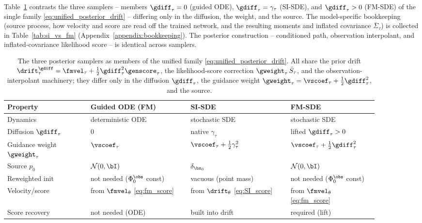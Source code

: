 Table~\ref{tab:samplers} contrasts the three samplers -- members $\gdiff_\tau=0$ (guided ODE), $\gdiff_\tau=\gamma_\tau$ (SI-SDE), and $\gdiff_\tau>0$ (FM-SDE) of the single family \eqref{eq:unified_posterior_drift} -- differing only in the diffusion, the weight, and the source. The model-specific bookkeeping (source process, how velocity and score are read off the trained network, and the resulting moments and inflated covariance $\bar\Sigma_\tau$) is collected in Table~\ref{tab:si_vs_fm} (Appendix~\ref{appendix:bookkeeping}). The posterior construction -- conditioned path, observation interpolant, and inflated-covariance likelihood score -- is identical across samplers.

\begin{table}[ht]
    \centering
    \caption{The three posterior samplers as members of the unified family \eqref{eq:unified_posterior_drift}. All share the prior drift $\drift^{\gdiff}_\tau=\fmvel_\tau+\tfrac12\gdiff_\tau^2\genscore_\tau$, the likelihood-score correction $\gweight_\tau\,\bar S_\tau$, and the observation-interpolant machinery; they differ only in the diffusion $\gdiff_\tau$, the guidance weight $\gweight_\tau=\vscoef_\tau+\tfrac12\gdiff_\tau^2$, and the source.}
    \label{tab:samplers}
    \small
    \begin{tabular}{p{0.2\linewidth}|p{0.24\linewidth}|p{0.24\linewidth}|p{0.21\linewidth}}
        \toprule
        \textbf{Property} & \textbf{Guided ODE (FM)} & \textbf{SI-SDE} & \textbf{FM-SDE} \\
        \midrule
        Dynamics & deterministic ODE & stochastic SDE & stochastic SDE \\
        Diffusion $\gdiff_\tau$ & $0$ & native $\gamma_\tau$ & lifted $\gdiff_\tau>0$ \\
        Guidance weight $\gweight_\tau$ & $\vscoef_\tau$ & $\vscoef_\tau+\tfrac12\gamma_\tau^2$ & $\vscoef_\tau+\tfrac12\gdiff_\tau^2$ \\
        Source $p_0$ & $\mathcal{N}(0,\bI)$ & $\delta_{\bx_0}$ & $\mathcal{N}(0,\bI)$ \\
        Reweighted init & not needed ($\Phi_0^{\obs}$ const) & vacuous (point mass) & not needed ($\Phi_0^{\obs}$ const) \\
        Velocity/score & from $\fmvel_\theta$ \eqref{eq:fm_score} & from $\drift_\theta$ \eqref{eq:SI_score} & from $\fmvel_\theta$ \eqref{eq:fm_score} \\
        Score recovery & not needed (ODE) & built into drift & required (lift) \\
        \bottomrule
    \end{tabular}
\end{table}

